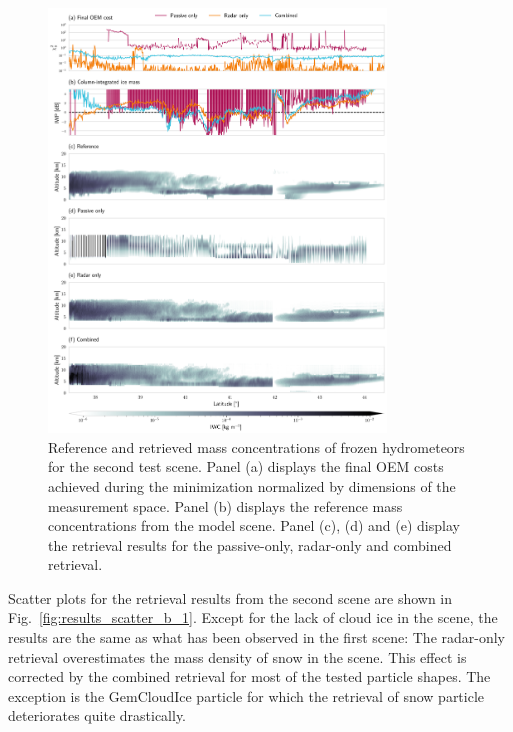 \documentclass[journal abbreviation, manuscript]{copernicus}
\begin{document}
\begin{figure}
\centering
\includegraphics[width = 0.8\textwidth]{../plots/results_b_LargePlateAggregate}
\caption{Reference and retrieved mass concentrations of frozen hydrometeors for
 the second test scene. Panel (a) displays the final OEM costs achieved during
 the minimization normalized by dimensions of the measurement space. Panel (b)
 displays the reference mass concentrations from the model scene. Panel (c),
 (d) and (e) display the retrieval results for the passive-only, radar-only
 and combined retrieval.}
\label{fig:results_b}
\end{figure}

Scatter plots for the retrieval results from the second scene are shown in
Fig.~\ref{fig:results_scatter_b_1}. Except for the lack of cloud ice in the
scene, the results are the same as what has been observed in the first scene:
The radar-only retrieval overestimates the mass density of snow in the scene.
This effect is corrected by the combined retrieval for most of the tested
particle shapes. The exception is the GemCloudIce particle for which the
retrieval of snow particle deteriorates quite drastically.
\end{document}
